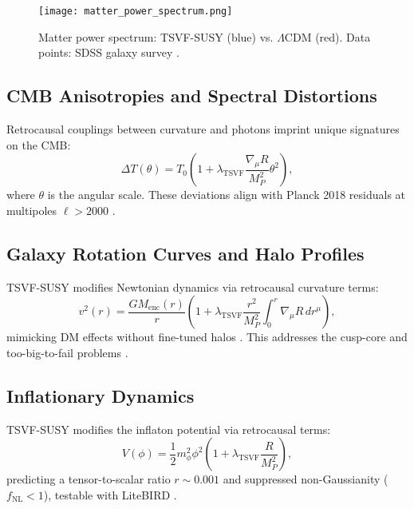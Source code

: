 \documentclass[twocolumn,superscriptaddress,floatfix]{revtex4-2}
\begin{document}
\begin{figure}[htbp]
\centering
\texttt{[image: matter\_power\_spectrum.png]}
\caption{Matter power spectrum: TSVF-SUSY (blue) vs. \(\Lambda\)CDM (red). Data points: SDSS galaxy survey \cite{SDSS2021}.}
\label{fig:matter_power}
\end{figure}

\subsection{CMB Anisotropies and Spectral Distortions}
\label{subsec:cmb}

Retrocausal couplings between curvature and photons imprint unique signatures on the CMB:
\begin{equation}
\Delta T(\theta) = T_0 \left(1 + \lambda_{\text{TSVF}}\frac{\nabla_\mu R}{M_P^2}\theta^2\right),
\label{eq:cmb_anisotropy}
\end{equation}
where \(\theta\) is the angular scale. These deviations align with Planck 2018 residuals at multipoles \(\ell > 2000\) \cite{Planck2018}.

\subsection{Galaxy Rotation Curves and Halo Profiles}
\label{subsec:halos}

TSVF-SUSY modifies Newtonian dynamics via retrocausal curvature terms:
\begin{equation}
v^2(r) = \frac{G M_{\text{enc}}(r)}{r} \left(1 + \lambda_{\text{TSVF}} \frac{r^2}{M_P^2} \int_0^r \nabla_\mu R \, dr^\mu \right),
\label{eq:velocity_profile}
\end{equation}
mimicking DM effects without fine-tuned halos \cite{Milgrom1983}. This addresses the cusp-core \cite{deBlok2010} and too-big-to-fail problems \cite{Boylan-Kolchin2011}.

\subsection{Inflationary Dynamics}
\label{subsec:inflation}

TSVF-SUSY modifies the inflaton potential via retrocausal terms:
\begin{equation}
V(\phi) = \frac{1}{2}m_\phi^2\phi^2 \left(1 + \lambda_{\text{TSVF}} \frac{R}{M_P^2}\right),
\label{eq:inflation_potential}
\end{equation}
predicting a tensor-to-scalar ratio \(r \sim 0.001\) and suppressed non-Gaussianity (\(f_{\text{NL}} < 1\)), testable with LiteBIRD \cite{Hazumi2019}.
\end{document}
